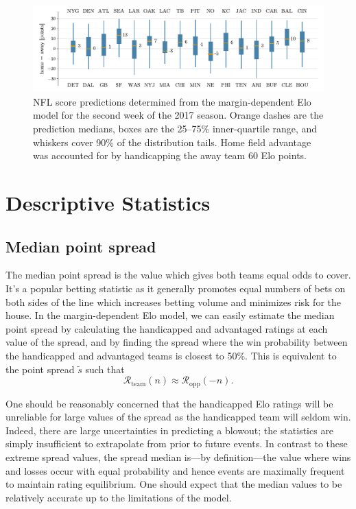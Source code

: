 \documentclass[aps,prc,reprint,amsmath,superscriptaddress]{revtex4-1}
\newcommand{\R}{\mathcal{R}}
\begin{document}
\begin{figure}
  \includegraphics{paper_spreads}
  \caption{NFL score predictions determined from the margin-dependent Elo model for the second week of the 2017 season. Orange dashes are the prediction medians, boxes are the 25--75\% inner-quartile range, and whiskers cover 90\% of the distribution tails. Home field advantage was accounted for by handicapping the away team 60 Elo points.}
\end{figure}

\section{Descriptive Statistics}

\subsection{Median point spread}

The median point spread is the value which gives both teams equal odds to cover.
It's a popular betting statistic as it generally promotes equal numbers of bets on both sides of the line which increases betting volume and minimizes risk for the house.
In the margin-dependent Elo model, we can easily estimate the median point spread by calculating the handicapped and advantaged ratings at each value of the spread, and by finding the spread where the win probability between the handicapped and advantaged teams is closest to 50\%.
This is equivalent to the point spread $\tilde{s}$ such that
\begin{equation}
  \R_\text{team}(n) \approx \R_\text{opp}(-n).
\end{equation}

One should be reasonably concerned that the handicapped Elo ratings will be unreliable for large values of the spread as the handicapped team will seldom win.
Indeed, there are large uncertainties in predicting a blowout; the statistics are simply insufficient to extrapolate from prior to future events.
In contrast to these extreme spread values, the spread median is---by definition---the value where wins and losses occur with equal probability and hence events are maximally frequent to maintain rating equilibrium.
One should expect that the median values to be relatively accurate up to the limitations of the model.
\end{document}
